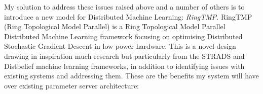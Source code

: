 My solution to address these issues raised above and a number of others is to
introduce a new model for Distributed Machine Learning: \textit{RingTMP}.
RingTMP (Ring Topological Model Parallel) is a Ring Topological Model Parallel
Distributed Machine Learning framework focusing on optimising Distributed
Stochastic Gradient Descent in low power hardware. This is a novel design
drawing in inspiration much research but particularly from the STRADS and
Distbelief machine learning frameworks, \cite{kim2016STRADS,Dean2012Distbelief}
in addition to identifying issues with existing systems and addressing them.
These are the benefits my system will have over existing parameter server
architecture:
\begin{itemize}


\end{itemize}
